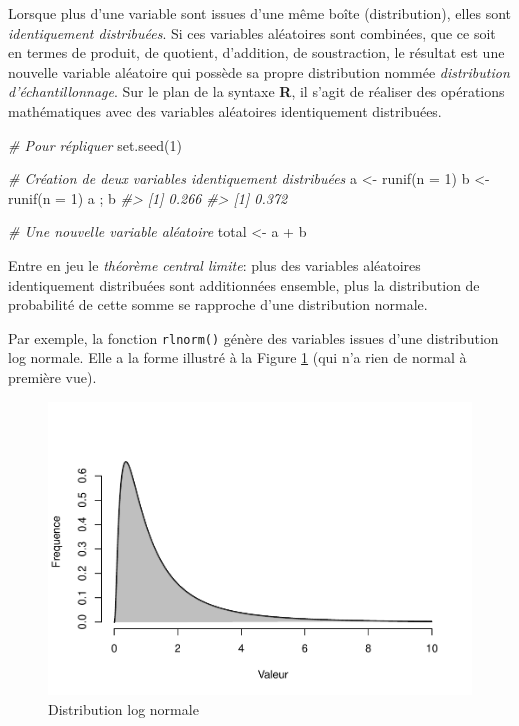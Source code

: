 \documentclass[
]{book}
\newenvironment{Shaded}{}{}
\newcommand{\AttributeTok}[1]{#1}
\newcommand{\CommentTok}[1]{\textit{#1}}
\newcommand{\DecValTok}[1]{#1}
\newcommand{\FunctionTok}[1]{#1}
\newcommand{\NormalTok}[1]{#1}
\newcommand{\OtherTok}[1]{#1}
\newcommand{\SpecialCharTok}[1]{#1}
\begin{document}
Lorsque plus d'une variable sont issues d'une même boîte (distribution), elles sont \emph{identiquement distribuées}. Si ces variables aléatoires sont combinées, que ce soit en termes de produit, de quotient, d'addition, de soustraction, le résultat est une nouvelle variable aléatoire qui possède sa propre distribution nommée \emph{distribution d'échantillonnage}. Sur le plan de la syntaxe \textbf{R}, il s'agit de réaliser des opérations mathématiques avec des variables aléatoires identiquement distribuées.

\begin{Shaded}
\begin{Highlighting}[]
\CommentTok{\# Pour répliquer}
\FunctionTok{set.seed}\NormalTok{(}\DecValTok{1}\NormalTok{)}

\CommentTok{\# Création de deux variables identiquement distribuées}
\NormalTok{a }\OtherTok{\textless{}{-}} \FunctionTok{runif}\NormalTok{(}\AttributeTok{n =} \DecValTok{1}\NormalTok{)}
\NormalTok{b }\OtherTok{\textless{}{-}} \FunctionTok{runif}\NormalTok{(}\AttributeTok{n =} \DecValTok{1}\NormalTok{)}
\NormalTok{a ; b}
\CommentTok{\#\textgreater{} [1] 0.266}
\CommentTok{\#\textgreater{} [1] 0.372}

\CommentTok{\# Une nouvelle variable aléatoire}
\NormalTok{total }\OtherTok{\textless{}{-}}\NormalTok{ a }\SpecialCharTok{+}\NormalTok{ b}
\end{Highlighting}
\end{Shaded}

Entre en jeu le \emph{théorème central limite}: plus des variables aléatoires identiquement distribuées sont additionnées ensemble, plus la distribution de probabilité de cette somme se rapproche d'une distribution normale.

Par exemple, la fonction \texttt{rlnorm()} génère des variables issues d'une distribution log normale. Elle a la forme illustré à la Figure \ref{fig:lognormal} (qui n'a rien de normal à première vue).

\begin{figure}

{\centering \includegraphics[width=0.8\linewidth,height=0.8\textheight]{08-Inferer_files/figure-latex/lognormal-1} 

}

\caption{Distribution log normale}\label{fig:lognormal}
\end{figure}
\end{document}
